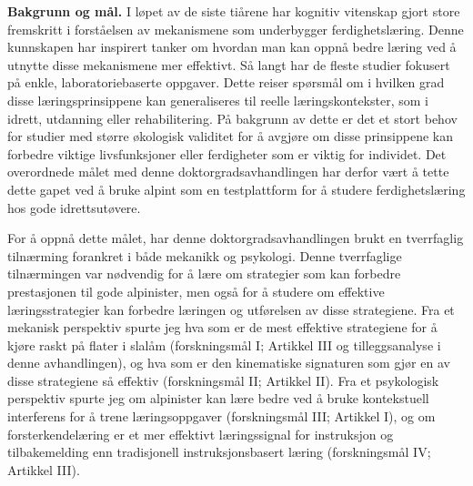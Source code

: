 \textbf{Bakgrunn og mål.} I løpet av de siste tiårene har kognitiv vitenskap gjort store fremskritt i forståelsen av mekanismene som underbygger ferdighetslæring. Denne kunnskapen har inspirert tanker om hvordan man kan oppnå bedre læring ved å utnytte disse mekanismene mer effektivt. Så langt har de fleste studier fokusert på enkle, laboratoriebaserte oppgaver. Dette reiser spørsmål om i hvilken grad disse læringsprinsippene kan generaliseres til reelle læringskontekster, som i idrett, utdanning eller rehabilitering. På bakgrunn av dette er det et stort behov for studier med større økologisk validitet for å avgjøre om disse prinsippene kan forbedre viktige livsfunksjoner eller ferdigheter som er viktig for individet. Det overordnede målet med denne doktorgradsavhandlingen har derfor vært å tette dette gapet ved å bruke alpint som en testplattform for å studere ferdighetslæring hos gode idrettsutøvere.

For å oppnå dette målet, har denne doktorgradsavhandlingen brukt en tverrfaglig tilnærming forankret i både mekanikk og psykologi. Denne tverrfaglige tilnærmingen var nødvendig for å lære om strategier som kan forbedre prestasjonen til gode alpinister, men også for å studere om effektive læringsstrategier kan forbedre læringen og utførelsen av disse strategiene. Fra et mekanisk perspektiv spurte jeg hva som er de mest effektive strategiene for å kjøre raskt på flater i slalåm (forskningsmål I; Artikkel III og tilleggsanalyse i denne avhandlingen), og hva som er den kinematiske signaturen som gjør en av disse strategiene så effektiv (forskningsmål II; Artikkel II). Fra et psykologisk perspektiv spurte jeg om alpinister kan lære bedre ved å bruke kontekstuell interferens for å trene læringsoppgaver (forskningsmål III; Artikkel I), og om forsterkendelæring er et mer effektivt læringssignal for instruksjon og tilbakemelding enn tradisjonell instruksjonsbasert læring (forskningsmål IV; Artikkel III).

